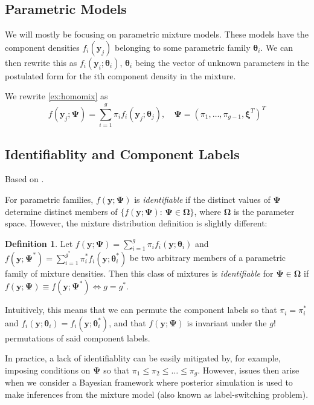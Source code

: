 \documentclass{article}\usepackage[]{graphicx}\usepackage[]{xcolor}
\theoremstyle{plain}
\theoremstyle{definition}
\newtheorem{definition}[theorem]{Definition}{}{}
\theoremstyle{remark}
\newcommand{\boldy}{\mathbf{y}}
\newcommand{\boldtheta}{\boldsymbol{\theta}}
\newcommand{\boldPsi}{\boldsymbol{\Psi}}
\newcommand{\boldxi}{\boldsymbol{\xi}}
\newcommand{\boldOmega}{\boldsymbol{\Omega}}
\begin{document}
\subsection{Parametric Models}

We will mostly be focusing on parametric mixture models. These models have the component densities $f_i(\boldy_j)$ belonging to some parametric family $\boldtheta_i$. We can then rewrite this as $f_i(\boldy_i; \boldtheta_i)$,   $\boldtheta_i$ being the vector of unknown parameters in the postulated form for the $i$th component density in the mixture.

We rewrite \eqref{ex:homomix} as
\begin{equation}
    f(\boldy_j ; \boldPsi) = \sum_{i=1}^g \pi_i f_i(\boldy_j; \boldtheta_j), \quad  \boldPsi = (\pi_1, \dots, \pi_{g-1}, \boldxi^T)^T
\end{equation}


\subsection{Identifiablity and Component Labels}
Based on \cite[Section 2.2]{annurev_FMMs}.

For parametric families, $f(\boldy; \boldPsi)$ is \textit{identifiable} if the distinct values of $\boldPsi$ determine distinct members of $\{f(\boldy; \boldPsi): \, \boldPsi \in \boldOmega\}$, where $\boldOmega$ is the parameter space. However, the mixture distribution definition is slightly different:
\begin{definition}
  Let $f(\boldy; \boldPsi) = \sum_{i=1}^g \pi_i f_i(\boldy; \boldtheta_i)$ and $f(\boldy; \boldPsi^*) = \sum_{i=1}^{g^*} \pi_i^* f_i(\boldy; \boldtheta_i^*)$ be two arbitrary members of a parametric family of mixture densities. Then this class of mixtures is \textit{identifiable} for $\boldPsi \in \boldOmega$ if $f(\boldy; \boldPsi) \equiv f(\boldy; \boldPsi^*) \iff g = g^*$.
\end{definition}
Intuitively, this means that we can permute the component labels so that $\pi_i = \pi_i^*$ and $f_i(\boldy; \boldtheta_i) = f_i(\boldy; \boldtheta_i^*)$, and that $f(\boldy; \boldPsi)$ is invariant under the $g!$ permutations of said component labels.

In practice, a lack of identifiablity can be easily mitigated by, for example, imposing conditions on $\boldPsi$ so that $\pi_1 \leq \pi_2 \leq \dots \leq \pi_g$. However, issues then arise when we consider a Bayesian framework where posterior simulation is used to make inferences from the mixture model (also known as label-switching problem).
\end{document}

